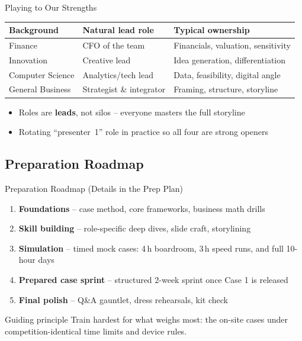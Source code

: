 \documentclass[aspectratio=169,11pt]{beamer}
\begin{document}
\begin{frame}{Playing to Our Strengths}
  \begin{center}
    \begin{tabular}{lll}
      \toprule
      \textbf{Background} & \textbf{Natural lead role} & \textbf{Typical ownership} \\
      \midrule
      Finance & CFO of the team & Financials, valuation, sensitivity \\
      Innovation & Creative lead & Idea generation, differentiation \\
      Computer Science & Analytics/tech lead & Data, feasibility, digital angle \\
      General Business & Strategist \& integrator & Framing, structure, storyline \\
      \bottomrule
    \end{tabular}
  \end{center}
  \begin{itemize}
    \item Roles are \textbf{leads}, not silos -- everyone masters the full storyline
    \item Rotating ``presenter~1'' role in practice so all four are strong openers
  \end{itemize}
\end{frame}

\subsection{Preparation Roadmap}

\begin{frame}{Preparation Roadmap (Details in the Prep Plan)}
  \begin{enumerate}
    \item \textbf{Foundations} -- case method, core frameworks, business math drills
    \item \textbf{Skill building} -- role-specific deep dives, slide craft, storylining
    \item \textbf{Simulation} -- timed mock cases: 4\,h boardroom, 3\,h speed runs, and full 10-hour days
    \item \textbf{Prepared case sprint} -- structured 2-week sprint once Case 1 is released
    \item \textbf{Final polish} -- Q\&A gauntlet, dress rehearsals, kit check
  \end{enumerate}
  \begin{exampleblock}{Guiding principle}
    Train hardest for what weighs most: the on-site cases under competition-identical time limits and device rules.
  \end{exampleblock}
\end{frame}
\end{document}

